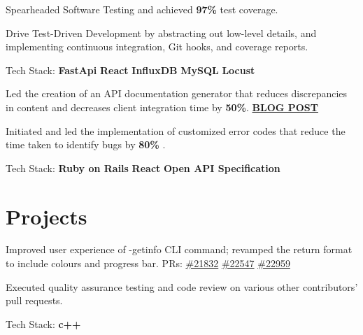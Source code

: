 \documentclass[]{Klement_Resume}
\begin{document}
\begin{minipage}[t]{0.66\textwidth}
\begin{tightemize}
\item Spearheaded Software Testing and achieved {\bf97\%} test coverage. 
\item Drive Test-Driven Development by abstracting out low-level details, and implementing continuous integration, Git hooks, and coverage reports.
\item Tech Stack: {\bf FastApi} \textbullet{} {\bf React} \textbullet{} {\bf InfluxDB} \textbullet{} {\bf MySQL} \textbullet{} {\bf Locust}
\end{tightemize}
\sectionsep


\begin{tightemize}
\item 
Led the creation of an API documentation generator that reduces discrepancies in content and decreases client integration time by {\bf50\%}. 
\href{https://medium.com/xfers-engineering/how-we-reduce-the-time-required-for-clients-to-integrate-our-apis-by-50-d14c76430e24}{\bf BLOG POST} 
\item
Initiated and led the implementation of customized error codes that reduce the time taken to identify bugs by { \bf 80\% }.
\item Tech Stack: {\bf Ruby on Rails} \textbullet{} {\bf React} \textbullet{} {\bf Open API Specification}
\end{tightemize}
\sectionsep
\section{Projects}
\begin{tightemize}
\item Improved user experience of -getinfo CLI command; revamped the return format to include colours and progress bar. PRs: \href{https://github.com/bitcoin/bitcoin/pull/21832}{\#21832} \href{https://github.com/bitcoin/bitcoin/pull/22547}{\#22547} \href{https://github.com/bitcoin/bitcoin/pull/22959}{\#22959}
\item Executed quality assurance testing and code review on various other contributors' pull requests.
\item Tech Stack: {\bf c++}
\end{tightemize}
\sectionsep


\end{minipage}
\end{document}
